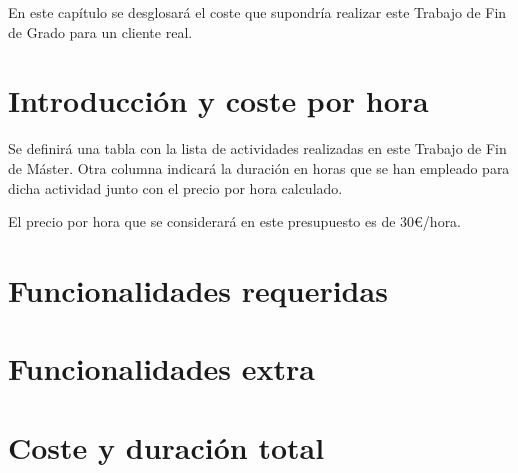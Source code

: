 


En este capítulo se desglosará el coste que supondría realizar este Trabajo de Fin de Grado para un cliente real.

\section{Introducción y coste por hora}
\label{6:sec:1}

Se definirá una tabla con la lista de actividades realizadas en este Trabajo de Fin de Máster. Otra columna indicará la duración en horas que se han empleado para dicha actividad junto con el precio por hora calculado.
\bigskip

El precio por hora que se considerará en este presupuesto es de 30\euro{}/hora.
\newpage
    
\section{Funcionalidades requeridas}
\label{6:sec:2}



\section{Funcionalidades extra}
\label{6:sec:3}


\newpage
\section{Coste y duración total}
\label{6:sec:4}


